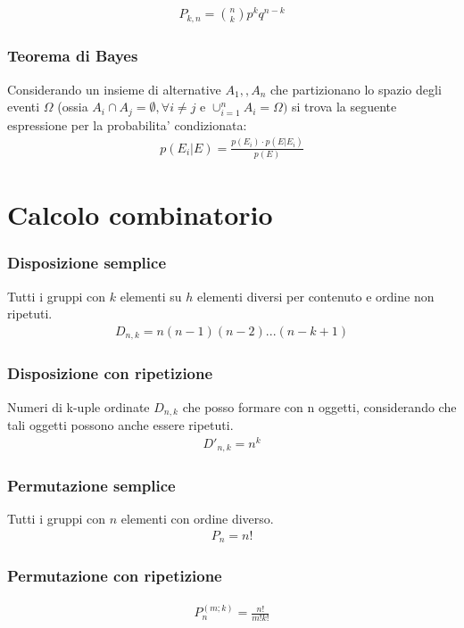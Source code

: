 \documentclass[a4paper]{article}
\begin{document}
	\begin{align*}
		P_{k,n} = {{n}\choose{k}} p^kq^{n-k}
	\end{align*}
	
	\subsubsection{Teorema di Bayes}
	Considerando un insieme di alternative $A_{1}, ,A_{n}$ che partizionano lo spazio degli eventi $\Omega$ (ossia $A_{i} \cap A_{j} = \emptyset , \forall i\neq j$ e $\cup _{{i=1}}^{n}A_{i}=\Omega )$ si trova la seguente espressione per la probabilita' condizionata:
	\begin{align*}
		p(E_i|E)= \frac{p(E_i) \cdot p(E | E_i)}{p(E)}
	\end{align*}
	
	\newpage
	\section{Calcolo combinatorio}
	\subsubsection{Disposizione semplice}
	Tutti i gruppi con $k$ elementi su $h$ elementi diversi per contenuto e ordine non ripetuti.
	\begin{align*}
		D_{n,k} = n(n-1)(n-2)...(n-k+1)
	\end{align*}

	\subsubsection{Disposizione con ripetizione}
	Numeri di k-uple ordinate $D_{n,k}$ che posso formare con n oggetti, considerando che tali oggetti possono anche essere ripetuti.
	\begin{align*}
		D'_{n,k} = n^k
	\end{align*}

	\subsubsection{Permutazione semplice}
	Tutti i gruppi con $n$ elementi con ordine diverso.
	\begin{align*}
		P_n = n! 
	\end{align*}
	
	\subsubsection{Permutazione con ripetizione}
	\begin{align*}
		P_n^{(m;k)}=\frac{n!}{m!k!}
	\end{align*}
	
\end{document}
